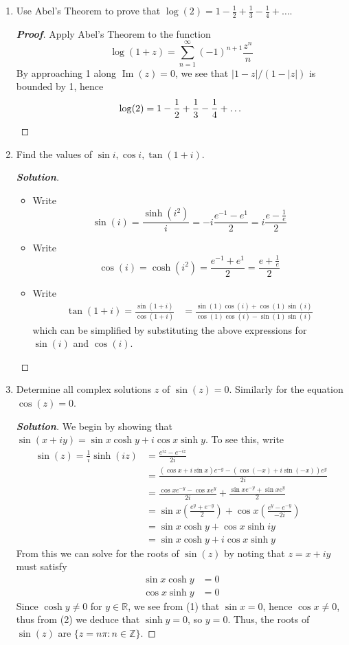 \documentclass[12pt,leqno]{article}
\theoremstyle{definition}
\newcommand{\im}{\operatorname{Im}}
\newcommand{\Z}{\mathbb{Z}}
\newcommand{\R}{\mathbb{R}}
\newenvironment{Proof}{\begin{proof}[\textnormal{\textbf{Proof}}]}{\end{proof}}
\newenvironment{Solution}{\begin{proof}[\textnormal{\textbf{Solution}}]}{\end{proof}}
\begin{document}
\begin{enumerate}
 \item Use Abel's Theorem to prove that $\log(2)=1-\frac{1}{2}+\frac{1}{3}-\frac{1}{4}+\hdots$.
  \begin{Proof}
   Apply Abel's Theorem to the function \[\log(1+z)=\sum_{n=1}^{\infty}(-1)^{n+1}\frac{z^n}{n}\] By approaching 1 along $\im(z)=0$, we see that $|1-z|/(1-|z|)$ is bounded by 1, hence \[\log(2)=1-\frac{1}{2}+\frac{1}{3}-\frac{1}{4}+\hdots\qedhere\]
  \end{Proof}
 \item Find the values of $\sin i,\cos i,\tan(1+i)$.
  \begin{Solution}\indent
   \begin{itemize}
    \item Write \[\sin(i)=\frac{\sinh(i^2)}{i}=-i\frac{e^{-1}-e^1}{2}=i\frac{e-\frac{1}{e}}{2}\]
    \item Write \[\cos(i)=\cosh(i^2)=\frac{e^{-1}+e^1}{2}=\frac{e+\frac{1}{e}}{2}\]
    \item Write \begin{align*}\tan(1+i)=\frac{\sin(1+i)}{\cos(1+i)}&=\frac{\sin(1)\cos(i)+\cos(1)\sin(i)}{\cos(1)\cos(i)-\sin(1)\sin(i)}\end{align*} which can be simplified by substituting the above expressions for $\sin(i)$ and $\cos(i)$.\qedhere
   \end{itemize}
  \end{Solution}
 \item Determine all complex solutions $z$ of $\sin(z)=0$. Similarly for the equation $\cos(z)=0$. 
  \begin{Solution}
   We begin by showing that $\sin(x+iy)=\sin x\cosh y+i\cos x\sinh y$. To see this, write \begin{align*}\sin(z)=\frac{1}{i}\sinh(iz)&=\frac{e^{iz}-e^{-iz}}{2i}\\&=\frac{(\cos x+i\sin x)e^{-y}-(\cos(-x)+i\sin(-x))e^y}{2i}\\&=\frac{\cos xe^{-y}-\cos xe^y}{2i}+\frac{\sin xe^{-y}+\sin xe^y}{2}\\&=\sin x\left(\frac{e^y+e^{-y}}{2}\right)+\cos x\left(\frac{e^y-e^{-y}}{-2i}\right)\\&=\sin x\cosh y+\cos x\sinh iy\\&=\sin x\cosh y+i\cos x\sinh y\end{align*} From this we can solve for the roots of $\sin(z)$ by noting that $z=x+iy$ must satisfy \begin{align*}\sin x\cosh y&=0\tag{1}\\\cos x\sinh y&=0\tag{2}\end{align*} Since $\cosh y\not=0$ for $y\in\R$, we see from (1) that $\sin x=0$, hence $\cos x\not=0$, thus from (2) we deduce that $\sinh y=0$, so $y=0$. Thus, the roots of $\sin(z)$ are $\{z=n\pi:n\in\Z\}$.


\end{Solution}
\end{enumerate}
\end{document}
